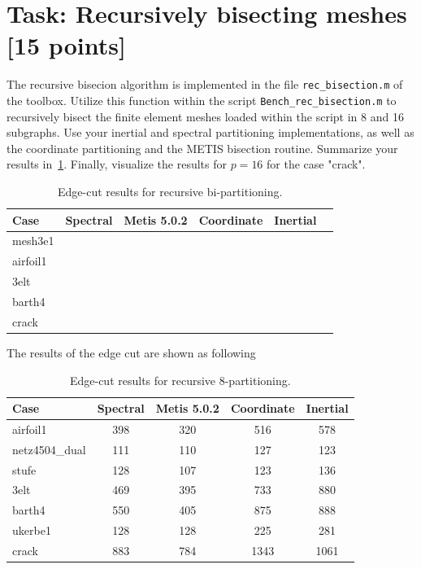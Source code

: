 \documentclass[unicode,11pt,a4paper,oneside,numbers=endperiod,openany]{scrartcl}
\begin{document}
\section{Task: Recursively bisecting meshes [15 points]}

The recursive bisecion algorithm is implemented in the file \texttt{rec\_bisection.m} of the toolbox. Utilize this function within the script \texttt{Bench\_rec\_bisection.m} to recursively bisect the finite element meshes loaded within the script in 8 and 16 subgraphs. Use your inertial and spectral partitioning implementations, as well as the coordinate partitioning and the METIS bisection routine. Summarize your results in~\ref{table:Rec_bisection}. Finally, visualize the results for $p= 16$ for the case "crack".

\begin{table}[h]
\caption{Edge-cut results for recursive bi-partitioning.}
\centering
\begin{tabular}{l|r|r|r|r|r} \hline\hline 
 Case            &  Spectral             &  Metis 5.0.2    & Coordinate & Inertial  \\ \hline
 mesh3e1         &                       &                 &            &           \\             
 airfoil1        &                       &                 &            &           \\ 
 3elt            &                       &                 &            &           \\ 
 barth4          &                       &                 &            &           \\ 
 crack           &                       &                 &            &           \\ \hline \hline
\end{tabular}
\label{table:Rec_bisection}
\end{table}

The results of the edge cut are shown as following 
\begin{table}[htbp]
    \centering
    \caption{Edge-cut results for recursive 8-partitioning.}
    \label{tab:edgecut_8partitioning}
    \begin{tabular}{lcccc}
        \toprule
        \textbf{Case} & \textbf{Spectral} & \textbf{Metis 5.0.2} & \textbf{Coordinate} & \textbf{Inertial} \\
        \midrule
        airfoil1         & 398 & 320 & 516  & 578  \\
        netz4504\_dual   & 111 & 110 & 127  & 123  \\
        stufe            & 128 & 107 & 123  & 136  \\
        3elt             & 469 & 395 & 733  & 880  \\
        barth4           & 550 & 405 & 875  & 888  \\
        ukerbe1          & 128 & 128 & 225  & 281  \\
        crack            & 883 & 784 & 1343 & 1061 \\
        \bottomrule
    \end{tabular}
\end{table}
\end{document}
